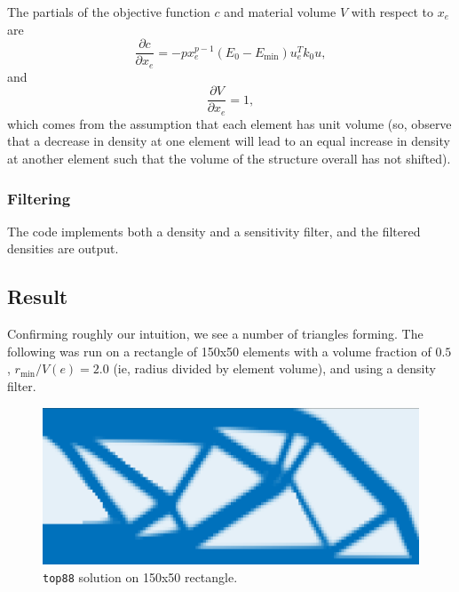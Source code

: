 The partials of the objective function $c$ and material volume $V$ with respect to $x_e$ are
\begin{equation}
    \frac{\partial c}{\partial x_e} = -p x_e^{p-1} (E_0 - E_{\text{min}}) u_e^T k_0 u,
\end{equation}
and
\begin{equation}
    \frac{\partial V}{\partial x_e} = 1,
\end{equation}
which comes from the assumption that each element has unit volume (so, observe that a decrease in density at
one element will lead to an equal increase in density at another element such that the volume of the structure
overall has not shifted).

\subsubsection{Filtering}

The code implements both a density and a sensitivity filter, and the filtered densities are output.

\subsection{Result}

Confirming roughly our intuition, we see a number of triangles forming. The following was run on a rectangle
of 150x50 elements with a volume fraction of $0.5$, $r_{\text{min}} / V(e) = 2.0$ (ie, radius divided by element volume),
and using a density filter.

\begin{figure}[H]
    \centering
    \caption{\texttt{top88} solution on 150x50 rectangle.}
    \includegraphics[width=\textwidth]{imgs/Top88/r150x50_density.png}
\end{figure}